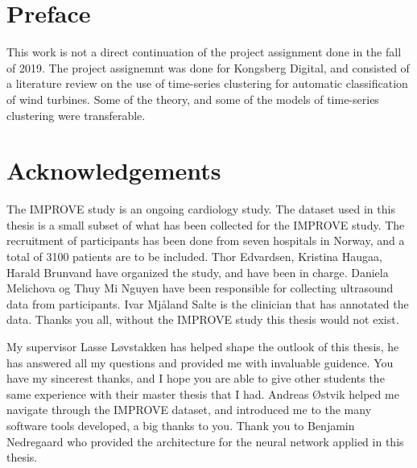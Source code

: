 \section*{Preface}
%

This work is not a direct continuation of the project assignment done in the fall of 2019. The project assignemnt was done for Kongsberg Digital, and consisted of a literature review on the use of time-series clustering for automatic classification of wind turbines. Some of the theory, and some of the models of time-series clustering were transferable.

\section*{Acknowledgements}

The IMPROVE study is an ongoing cardiology study. The dataset used in this thesis is a small subset of what has been collected for the IMPROVE study. The recruitment of participants has been done from seven hospitals in Norway, and a total of 3100 patients are to be included. Thor Edvardsen, Kristina Haugaa, Harald Brunvand have organized the study, and have been in charge. Daniela Melichova og Thuy Mi Nguyen have been responsible for collecting ultrasound data from participants. Ivar Mjåland Salte is the clinician that has annotated the data. Thanks you all, without the IMPROVE study this thesis would not exist. \bigskip

My supervisor Lasse Løvstakken has helped shape the outlook of this thesis, he has answered all my questions and provided me with invaluable guidence. You have my sincerest thanks, and I hope you are able to give other students the same experience with their master thesis that I had. Andreas Østvik helped me navigate through the IMPROVE dataset, and introduced me to the many software tools developed, a big thanks to you. Thank you to Benjamin Nedregaard who provided the architecture for the neural network applied in this thesis.

\clearpage
